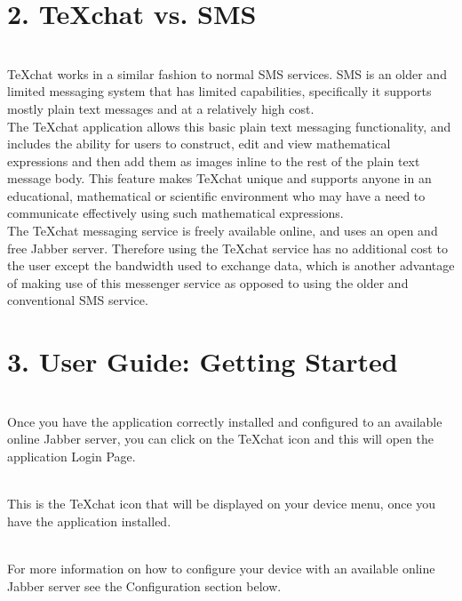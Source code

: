 \documentclass[29pt,a4paper]{moderncv}
\begin{document}
\section*{\textbf{2. TeXchat vs. SMS}}
	\vspace{4mm}
		 \\TeXchat works in a similar fashion to normal SMS services. SMS is an older and limited messaging system that has limited capabilities, specifically it supports mostly plain text messages and at a relatively high cost. \\ 
		 
		 The TeXchat application allows this basic plain text messaging functionality, and includes the ability for users to construct, edit and view mathematical expressions and then add them as images inline to the rest of the plain text message body.  This feature makes TeXchat unique and supports anyone in an educational, mathematical or scientific environment who may have a need to communicate effectively using such mathematical expressions. \\  
		 
		 The TeXchat messaging service is freely available online, and uses an open and free Jabber server.  Therefore using the TeXchat service has no additional cost to the user except the bandwidth used to exchange data, which is another advantage of making use of this messenger service as opposed to using the older and conventional SMS service.   \\
	\vspace{5mm}
		
	\section*{3. User Guide: Getting Started}
	\vspace{4mm}
	\\Once you have the application correctly installed and configured to an available online Jabber server, you can click on the TeXchat icon and this will open the application Login Page.  
	
	\\This is the TeXchat icon that will be displayed on your device menu, once you have the application installed.
	
	\\For more information on how to configure your device with an available online Jabber server see the Configuration section below.
	
	\vspace{5mm}
\end{document}
